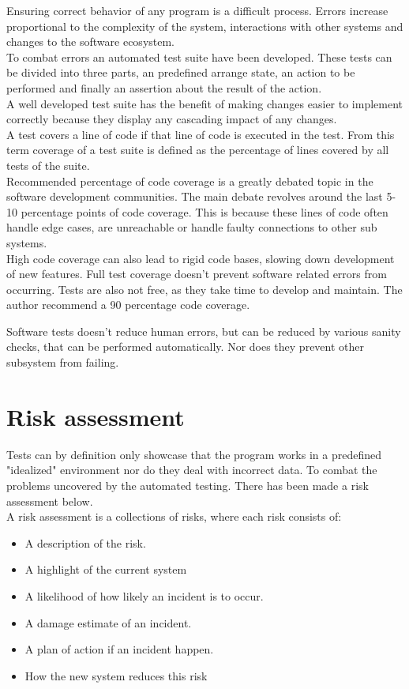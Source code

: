 \documentclass{article}
\begin{document}
Ensuring correct behavior of any program is a difficult process. Errors increase
proportional to the complexity of the system, interactions with other systems
and changes to the software ecosystem.\\
To combat errors an automated test suite have been developed. These tests can be
divided into three parts, an predefined arrange state, an action to be performed
and finally an assertion about the result of the action.\\
A well developed test suite has the benefit of making changes easier to
implement correctly because they display any cascading impact of any changes.\\
A test covers a line of code if that line of code is executed in the test. From
this term coverage of a test suite is defined as the percentage of lines covered
by all tests of the suite.\\
Recommended percentage of code coverage is a greatly debated topic in the
software development communities. The main debate revolves around the last 5-10
percentage points of code coverage. This is because these lines of code often
handle edge cases, are unreachable or handle faulty connections to other sub
systems.\\
High code coverage can also lead to rigid code bases, slowing down development
of new features. Full test coverage doesn't prevent software related errors from
occurring. Tests are also not free, as they take time to develop and maintain.
The author recommend a 90 percentage code coverage.

Software tests doesn't reduce human errors, but can be reduced by various sanity
checks, that can be performed automatically. Nor does they prevent other
subsystem from failing.

\section*{Risk assessment}

Tests can by definition only showcase that the program works in a predefined
"idealized" environment nor do they deal with incorrect data.
To combat the problems uncovered by the automated testing. There has been made a
risk assessment below.\\
A risk assessment is a collections of risks, where each risk consists of:

\begin{itemize}
  \item A description of the risk.
  \item A highlight of the current system
  \item A likelihood of how likely an incident is to occur.
  \item A damage estimate of an incident.
  \item A plan of action if an incident happen.
  \item How the new system reduces this risk
\end{itemize}
\end{document}
